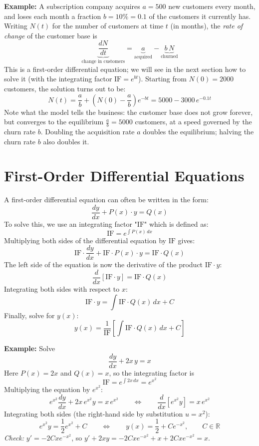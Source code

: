 \documentclass[]{article}
\newcommand{\R}{\mathbb{R}}
\begin{document}
	\noindent \textbf{Example:}
	A subscription company acquires $a = 500$ new customers every month, and loses each month a fraction $b = 10\% = 0.1$ of the customers it currently has.
	Writing $N(t)$ for the number of customers at time $t$ (in months), the \textit{rate of change} of the customer base is
	$$
	\underbrace{\frac{dN}{dt}}_{\text{change in customers}} = \underbrace{a}_{\text{acquired}} - \underbrace{b \, N}_{\text{churned}}
	$$
	This is a first-order differential equation; we will see in the next section how to solve it (with the integrating factor $\text{IF} = e^{bt}$).
	Starting from $N(0) = 2000$ customers, the solution turns out to be:
	$$
	N(t) = \frac{a}{b} + \left(N(0) - \frac{a}{b}\right)e^{-bt} = 5000 - 3000 \, e^{-0.1 t}
	$$
	Note what the model tells the business: the customer base does not grow forever, but converges to the equilibrium $\frac{a}{b} = 5000$ customers, at a speed governed by the churn rate $b$.
	Doubling the acquisition rate $a$ doubles the equilibrium; halving the churn rate $b$ also doubles it.
	
	
	
	\section{First-Order Differential Equations}
	
	A first-order differential equation can often be written in the form:
	$$
	\frac{dy}{dx} + P(x) \cdot y = Q(x)
	$$
	To solve this, we use an integrating factor "$\text{IF}$" which is defined as:
	$$
	\text{IF} = e^{\int P(x) \, dx}
	$$
	Multiplying both sides of the differential equation by $\text{IF}$ gives:
	$$
	\text{IF} \cdot \frac{dy}{dx} + \text{IF} \cdot P(x) \cdot y = \text{IF} \cdot Q(x)
	$$
	The left side of the equation is now the derivative of the product $\text{IF} \cdot y$:
	$$
	\frac{d}{dx}\left[\text{IF} \cdot y\right] = \text{IF} \cdot Q(x)
	$$
	Integrating both sides with respect to $x$:
	$$
	\text{IF} \cdot y = \int \text{IF} \cdot Q(x) \, dx + C
	$$
	Finally, solve for $y(x)$:
	$$
	y(x) = \frac{1}{\text{IF}}\left[\int \text{IF} \cdot Q(x) \, dx + C\right]
	$$

	\noindent \textbf{Example:}
	Solve
	$$
	\frac{dy}{dx} + 2x \, y = x
	$$
	Here $P(x) = 2x$ and $Q(x) = x$, so the integrating factor is
	$$
	\text{IF} = e^{\int 2x \, dx} = e^{x^2}
	$$
	Multiplying the equation by $e^{x^2}$:
	$$
	e^{x^2}\frac{dy}{dx} + 2x \, e^{x^2} y = x \, e^{x^2}
	\qquad \Longleftrightarrow \qquad
	\frac{d}{dx}\left[e^{x^2} y\right] = x \, e^{x^2}
	$$
	Integrating both sides (the right-hand side by substitution $u = x^2$):
	$$
	e^{x^2} y = \frac{1}{2} e^{x^2} + C
	\qquad \Longleftrightarrow \qquad
	y(x) = \frac{1}{2} + C e^{-x^2}, \qquad C \in \R
	$$
	\textit{Check:} $y' = -2Cx e^{-x^2}$, so $y' + 2xy = -2Cx e^{-x^2} + x + 2Cx e^{-x^2} = x$. \checkmark
\end{document}
